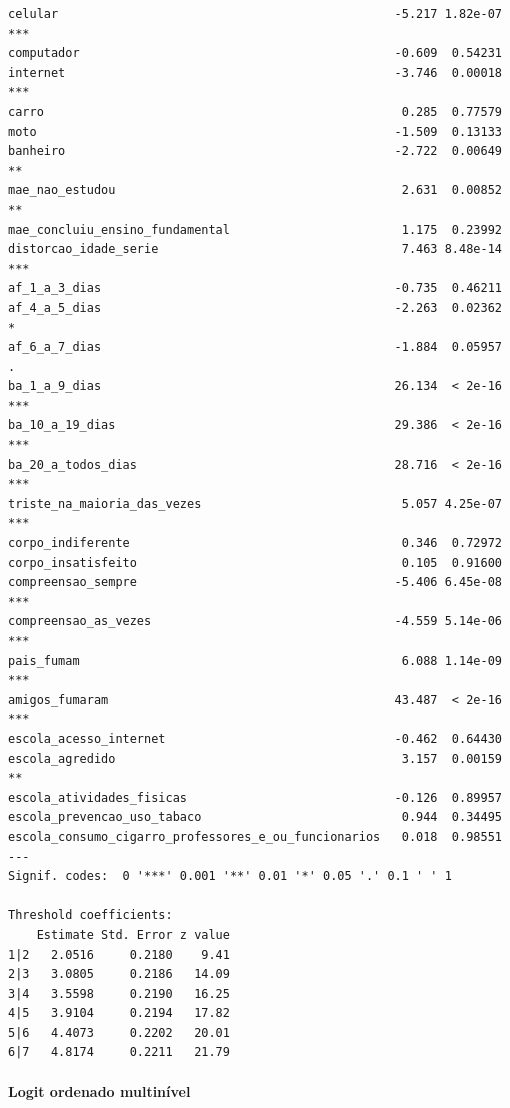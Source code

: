 \documentclass[
]{article}
\let\oldparagraph\paragraph
\renewcommand{\paragraph}[1]{\oldparagraph{#1}\mbox{}}
\begin{document}
\begin{verbatim}
celular                                               -5.217 1.82e-07 ***
computador                                            -0.609  0.54231    
internet                                              -3.746  0.00018 ***
carro                                                  0.285  0.77579    
moto                                                  -1.509  0.13133    
banheiro                                              -2.722  0.00649 ** 
mae_nao_estudou                                        2.631  0.00852 ** 
mae_concluiu_ensino_fundamental                        1.175  0.23992    
distorcao_idade_serie                                  7.463 8.48e-14 ***
af_1_a_3_dias                                         -0.735  0.46211    
af_4_a_5_dias                                         -2.263  0.02362 *  
af_6_a_7_dias                                         -1.884  0.05957 .  
ba_1_a_9_dias                                         26.134  < 2e-16 ***
ba_10_a_19_dias                                       29.386  < 2e-16 ***
ba_20_a_todos_dias                                    28.716  < 2e-16 ***
triste_na_maioria_das_vezes                            5.057 4.25e-07 ***
corpo_indiferente                                      0.346  0.72972    
corpo_insatisfeito                                     0.105  0.91600    
compreensao_sempre                                    -5.406 6.45e-08 ***
compreensao_as_vezes                                  -4.559 5.14e-06 ***
pais_fumam                                             6.088 1.14e-09 ***
amigos_fumaram                                        43.487  < 2e-16 ***
escola_acesso_internet                                -0.462  0.64430    
escola_agredido                                        3.157  0.00159 ** 
escola_atividades_fisicas                             -0.126  0.89957    
escola_prevencao_uso_tabaco                            0.944  0.34495    
escola_consumo_cigarro_professores_e_ou_funcionarios   0.018  0.98551    
---
Signif. codes:  0 '***' 0.001 '**' 0.01 '*' 0.05 '.' 0.1 ' ' 1

Threshold coefficients:
    Estimate Std. Error z value
1|2   2.0516     0.2180    9.41
2|3   3.0805     0.2186   14.09
3|4   3.5598     0.2190   16.25
4|5   3.9104     0.2194   17.82
5|6   4.4073     0.2202   20.01
6|7   4.8174     0.2211   21.79
\end{verbatim}

\hypertarget{logit-ordenado-multinuxedvel}{%
\paragraph{Logit ordenado
multinível}\label{logit-ordenado-multinuxedvel}}
\end{document}
